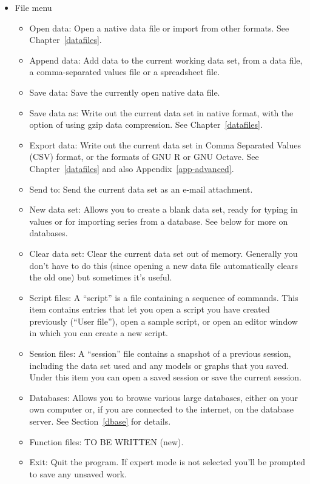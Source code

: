 \begin{itemize}
\item \textsf{File menu}
  \begin{itemize}
  \item \textsf{Open data}: Open a native  data file or
    import from other formats.  See Chapter~\ref{datafiles}.
  \item \textsf{Append data}: Add data to the current working data
    set, from a  data file, a comma-separated values file
    or a spreadsheet file.
  \item \textsf{Save data}: Save the currently open native 
    data file.
  \item \textsf{Save data as}: Write out the current data set in
    native format, with the option of using gzip data compression. See
    Chapter~\ref{datafiles}.
  \item \textsf{Export data}: Write out the current data set in Comma
    Separated Values (CSV) format, or the formats of GNU R or GNU
    Octave. See Chapter~\ref{datafiles} and also
    Appendix~\ref{app-advanced}.
  \item \textsf{Send to}: Send the current data set as an e-mail
    attachment.
  \item \textsf{New data set}: Allows you to create a blank data set,
    ready for typing in values or for importing series from a
    database.  See below for more on databases.
  \item \textsf{Clear data set}: Clear the current data set out of
    memory.  Generally you don't have to do this (since opening a new
    data file automatically clears the old one) but sometimes it's
    useful.
  \item \textsf{Script files}: A ``script'' is a file containing a
    sequence of  commands.  This item contains entries
    that let you open a script you have created previously (``User
    file''), open a sample script, or open an editor window in which
    you can create a new script.
  \item \textsf{Session files}: A ``session'' file contains a snapshot
    of a previous  session, including the data set used
    and any models or graphs that you saved.  Under this item you
    can open a saved session or save the current session.
  \item \textsf{Databases}: Allows you to browse various large
    databases, either on your own computer or, if you are connected
    to the internet, on the  database server.  See
    Section~\ref{dbase} for details.
  \item \textsf{Function files}: TO BE WRITTEN (new).
  \item \textsf{Exit}: Quit the program. If expert mode is not
    selected you'll be prompted to save any unsaved work.
  \end{itemize}


\end{itemize}
